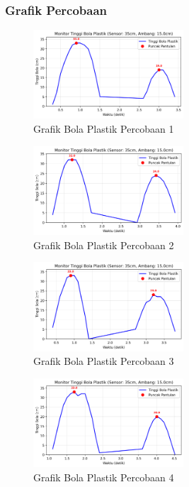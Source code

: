 \subsubsection{Grafik Percobaan}
\begin{figure}[htbp]
    \centering
    \includegraphics[width=0.5\textwidth]{chapters/DataPercobaan/Grafik_Bola_Plastik_1.png}
    \caption{Grafik Bola Plastik Percobaan 1}
\end{figure}
\begin{figure}[htbp]
    \centering
    \includegraphics[width=0.5\textwidth]{chapters/DataPercobaan/Grafik_Bola_Plastik_2.png}
    \caption{Grafik Bola Plastik Percobaan 2}
\end{figure}
\begin{figure}[htbp]
    \centering
    \includegraphics[width=0.5\textwidth]{chapters/DataPercobaan/Grafik_Bola_Plastik_3.png}
    \caption{Grafik Bola Plastik Percobaan 3}
\end{figure}
\begin{figure}[htbp]
    \centering
    \includegraphics[width=0.5\textwidth]{chapters/DataPercobaan/Grafik_Bola_Plastik_4.png}
    \caption{Grafik Bola Plastik Percobaan 4}
\end{figure}
